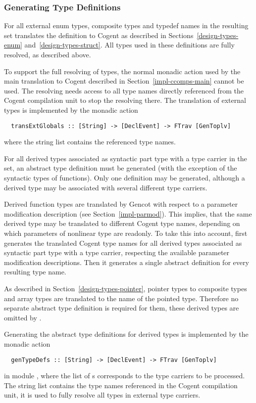 \subsubsection{Generating Type Definitions}

For all external enum types, composite types and typedef names in the resulting set  translates the
definition to Cogent as described in Sections~\ref{design-types-enum} and~\ref{design-types-struct}.
All types used in these definitions are fully resolved, as described above.

To support the full resolving of types, the normal monadic action  used by the main translation 
to Cogent described in Section~\ref{impl-ccomps-main} cannot be used. The resolving needs access to all
type names directly referenced from the Cogent compilation unit to stop the resolving there.
The translation of external types is implemented by the monadic action 
\begin{verbatim}
  transExtGlobals :: [String] -> [DeclEvent] -> FTrav [GenToplv]
\end{verbatim}
where the string list contains the referenced type names.

For all derived types associated as syntactic part type with a type carrier in the set, an abstract type
definition must be generated (with the exception of the syntactic types of functions). Only one definition
may be generated, although a derived type may be associated with several different type carriers.

Derived function types are translated by Gencot with respect to a parameter modification description
(see Section~\ref{impl-parmod}). This implies, that the same derived type may be translated to different
Cogent type names, depending on which parameters of nonlinear type are readonly. To take this into account,
 first generates the translated Cogent type names for all derived types associated 
as syntactic part type with a type carrier, respecting the available parameter modification descriptions.
Then it generates a single abstract definition for every resulting type name.

As described in Section~\ref{design-types-pointer}, pointer types to composite types and array types are translated
to the name of the pointed type. Therefore no separate abstract type definition is required for them, these
derived types are omitted by .

Generating the abstract type definitions for derived types is implemented by the monadic action
\begin{verbatim}
  genTypeDefs :: [String] -> [DeclEvent] -> FTrav [GenToplv]
\end{verbatim}
in module , where the list of s corresponds to the type carriers
to be processed. The string list contains the type names referenced in the Cogent compilation unit, it is
used to fully resolve all types in external type carriers.

